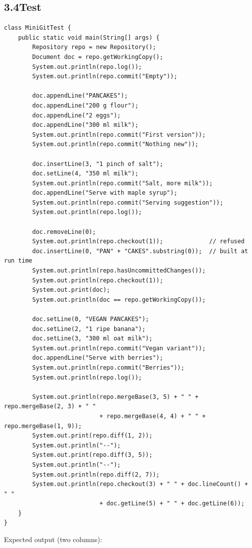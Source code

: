 \documentclass[11pt,a4paper]{article}
\begin{document}
\subsection*{3.4\quad Test}
\begin{lstlisting}
class MiniGitTest {
    public static void main(String[] args) {
        Repository repo = new Repository();
        Document doc = repo.getWorkingCopy();
        System.out.println(repo.log());
        System.out.println(repo.commit("Empty"));

        doc.appendLine("PANCAKES");
        doc.appendLine("200 g flour");
        doc.appendLine("2 eggs");
        doc.appendLine("300 ml milk");
        System.out.println(repo.commit("First version"));
        System.out.println(repo.commit("Nothing new"));

        doc.insertLine(3, "1 pinch of salt");
        doc.setLine(4, "350 ml milk");
        System.out.println(repo.commit("Salt, more milk"));
        doc.appendLine("Serve with maple syrup");
        System.out.println(repo.commit("Serving suggestion"));
        System.out.println(repo.log());

        doc.removeLine(0);
        System.out.println(repo.checkout(1));             // refused
        doc.insertLine(0, "PAN" + "CAKES".substring(0));  // built at run time
        System.out.println(repo.hasUncommittedChanges());
        System.out.println(repo.checkout(1));
        System.out.print(doc);
        System.out.println(doc == repo.getWorkingCopy());

        doc.setLine(0, "VEGAN PANCAKES");
        doc.setLine(2, "1 ripe banana");
        doc.setLine(3, "300 ml oat milk");
        System.out.println(repo.commit("Vegan variant"));
        doc.appendLine("Serve with berries");
        System.out.println(repo.commit("Berries"));
        System.out.println(repo.log());

        System.out.println(repo.mergeBase(3, 5) + " " + repo.mergeBase(2, 3) + " "
                           + repo.mergeBase(4, 4) + " " + repo.mergeBase(1, 9));
        System.out.print(repo.diff(1, 2));
        System.out.println("--");
        System.out.print(repo.diff(3, 5));
        System.out.println("--");
        System.out.println(repo.diff(2, 7));
        System.out.println(repo.checkout(3) + " " + doc.lineCount() + " "
                           + doc.getLine(5) + " " + doc.getLine(6));
    }
}
\end{lstlisting}
Expected output (two columns):
\end{document}
